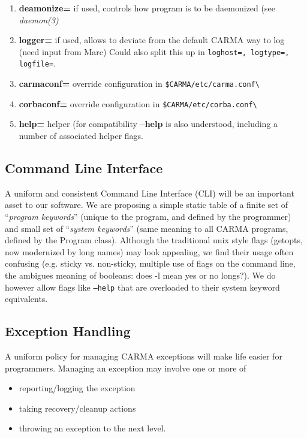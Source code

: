 \documentclass[preprint]{aastex} %
\begin{document}
\begin{enumerate}
\item {\bf deamonize=} if used, controls how program is to be daemonized (see {\it daemon(3)}
\item {\bf logger=} if used, allows to deviate from the default CARMA way to log (need input from Marc)
  Could also split this up in {\tt loghost=, logtype=, logfile=}.
\item {\bf carmaconf=} override configuration in \verb+$CARMA/etc/carma.conf\+ 
\item {\bf corbaconf=} override configuration in \verb+$CARMA/etc/corba.conf\+ 
\item {\bf help=} helper (for compatibility {\bf --help} is also understood, including a number of
  associated helper flags.



\end{enumerate}


\subsection{Command Line Interface}

A uniform and consistent Command Line Interface (CLI) will be an important
asset to our software. We are proposing a simple static table of a finite
set of ``{\it program keywords}'' (unique to the program, and defined
by the programmer) and
small set of ``{\it system keywords}'' (same meaning to all CARMA programs,
defined by the Program class).
Although the traditional unix style flags (getopts, now modernized by 
long names) may look appealing, we find their usage often confusing
(e.g. sticky vs. non-sticky, multiple use of flags on the command line, 
the ambigues meaning of booleans: does -l mean yes or no longs?).
We do however allow flags like {\tt --help} that are overloaded to their
system keyword equivalents.

\subsection{Exception Handling}

A uniform policy for managing CARMA exceptions will make life easier for 
programmers. Managing an exception may involve one or more of 

\begin{itemize}

\item
reporting/logging the exception

\item
taking recovery/cleanup actions

\item
throwing an exception to the next level.

\end{itemize}
\end{document}
